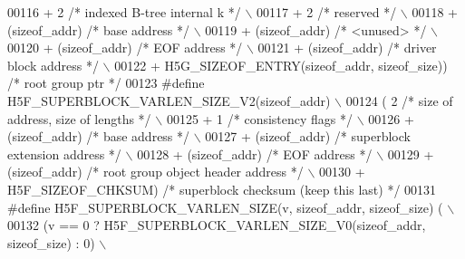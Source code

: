 \begin{DoxyCode}
00116 \textcolor{preprocessor}{        + 2 }\textcolor{comment}{/* indexed B-tree internal k */}\textcolor{preprocessor}{                             \(\backslash\)}
00117 \textcolor{preprocessor}{        + 2 }\textcolor{comment}{/* reserved */}\textcolor{preprocessor}{                                              \(\backslash\)}
00118 \textcolor{preprocessor}{        + (sizeof\_addr) }\textcolor{comment}{/* base address */}\textcolor{preprocessor}{                              \(\backslash\)}
00119 \textcolor{preprocessor}{        + (sizeof\_addr) }\textcolor{comment}{/* <unused> */}\textcolor{preprocessor}{                                  \(\backslash\)}
00120 \textcolor{preprocessor}{        + (sizeof\_addr) }\textcolor{comment}{/* EOF address */}\textcolor{preprocessor}{                               \(\backslash\)}
00121 \textcolor{preprocessor}{        + (sizeof\_addr) }\textcolor{comment}{/* driver block address */}\textcolor{preprocessor}{                      \(\backslash\)}
00122 \textcolor{preprocessor}{        + H5G\_SIZEOF\_ENTRY(sizeof\_addr, sizeof\_size)) }\textcolor{comment}{/* root group ptr */}\textcolor{preprocessor}{}
00123 \textcolor{preprocessor}{#define H5F\_SUPERBLOCK\_VARLEN\_SIZE\_V2(sizeof\_addr)                      \(\backslash\)}
00124 \textcolor{preprocessor}{        ( 2 }\textcolor{comment}{/* size of address, size of lengths */}\textcolor{preprocessor}{                      \(\backslash\)}
00125 \textcolor{preprocessor}{        + 1 }\textcolor{comment}{/* consistency flags */}\textcolor{preprocessor}{                                     \(\backslash\)}
00126 \textcolor{preprocessor}{        + (sizeof\_addr) }\textcolor{comment}{/* base address */}\textcolor{preprocessor}{                              \(\backslash\)}
00127 \textcolor{preprocessor}{        + (sizeof\_addr) }\textcolor{comment}{/* superblock extension address */}\textcolor{preprocessor}{              \(\backslash\)}
00128 \textcolor{preprocessor}{        + (sizeof\_addr) }\textcolor{comment}{/* EOF address */}\textcolor{preprocessor}{                               \(\backslash\)}
00129 \textcolor{preprocessor}{        + (sizeof\_addr) }\textcolor{comment}{/* root group object header address */}\textcolor{preprocessor}{          \(\backslash\)}
00130 \textcolor{preprocessor}{        + H5F\_SIZEOF\_CHKSUM) }\textcolor{comment}{/* superblock checksum (keep this last) */}\textcolor{preprocessor}{}
00131 \textcolor{preprocessor}{#define H5F\_SUPERBLOCK\_VARLEN\_SIZE(v, sizeof\_addr, sizeof\_size) (   \(\backslash\)}
00132 \textcolor{preprocessor}{        (v == 0 ? H5F\_SUPERBLOCK\_VARLEN\_SIZE\_V0(sizeof\_addr, sizeof\_size) : 0) \(\backslash\)}

\end{DoxyCode}
